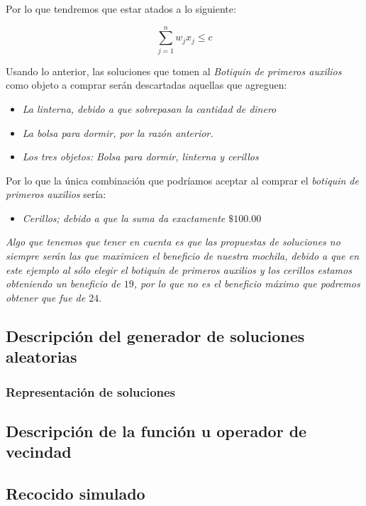 \documentclass{article}
\begin{document}
Por lo que tendremos que estar atados a lo siguiente:

\begin{equation*}
\sum_{j=1}^n w_{j}x_{j} \leq c
\end{equation*}

Usando lo anterior, las soluciones que tomen al \textit{Botiquin de primeros auxilios} como objeto a comprar serán descartadas aquellas que agreguen:

\begin{itemize}
	\item \textit{La linterna, debido a que sobrepasan la cantidad de dinero}
	\item \textit{La bolsa para dormir, por la razón anterior.}
	\item \textit{Los tres objetos: Bolsa para dormir, linterna y cerillos}
\end{itemize}

Por lo que la única combinación que podríamos aceptar al comprar el \textit{botiquin de primeros auxilios} sería:

\begin{itemize}
	\item \textit{Cerillos; debido a que la suma da exactamente $\$100.00$}
\end{itemize}

\textit{Algo que tenemos que tener en cuenta es que las propuestas de soluciones no siempre serán las que maximicen el beneficio de nuestra mochila, debido a que en este ejemplo al sólo elegir el botiquin de primeros auxilios y los cerillos estamos obteniendo un beneficio de $19$, por lo que no es el beneficio máximo que podremos obtener que fue de $24$}.

\subsection*{Descripción del generador de soluciones aleatorias}

\subsubsection*{Representación de soluciones}

\subsection*{Descripción de la función u operador de vecindad}

\subsection*{Recocido simulado}
\end{document}
